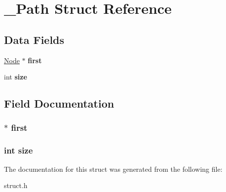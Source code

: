 \hypertarget{struct___path}{}\section{\+\_\+\+Path Struct Reference}
\label{struct___path}
\subsection*{Data Fields}
\begin{DoxyCompactItemize}
\item 
\hyperlink{struct___node}{Node} $\ast$ {\bfseries first}\hypertarget{struct___path_a2addc5f5fab651284199528b83cd61c8}{}\label{struct___path_a2addc5f5fab651284199528b83cd61c8}

\item 
int {\bfseries size}\hypertarget{struct___path_a439227feff9d7f55384e8780cfc2eb82}{}\label{struct___path_a439227feff9d7f55384e8780cfc2eb82}

\end{DoxyCompactItemize}


\subsection{Field Documentation}
\subsubsection[{\texorpdfstring{first}{first}}]{$\ast$ first}\hypertarget{struct___path_a2addc5f5fab651284199528b83cd61c8}{}\label{struct___path_a2addc5f5fab651284199528b83cd61c8}
\subsubsection[{\texorpdfstring{size}{size}}]{\setlength{\rightskip}{0pt plus 5cm}int size}\hypertarget{struct___path_a439227feff9d7f55384e8780cfc2eb82}{}\label{struct___path_a439227feff9d7f55384e8780cfc2eb82}


The documentation for this struct was generated from the following file\+:\begin{DoxyCompactItemize}
\item 
struct.\+h\end{DoxyCompactItemize}
